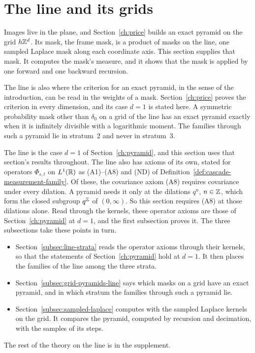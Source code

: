 \section{The line and its grids}
\label{sec:line-theory}

Images live in the plane, and Section~\ref{ch:price} builds an exact pyramid on the grid
$h\mathbb{Z}^d$. Its mask, the frame mask, is a product of masks on the line, one sampled Laplace mask
along each coordinate axis. This section supplies that mask. It computes the mask's \Levy{} measure,
and it shows that the mask is applied by one forward and one backward recursion.

The line is also where the criterion for an exact pyramid, in the sense of the introduction, can be
read in the weights of a mask. Section~\ref{ch:price} proves the criterion in every dimension, and
its case $d = 1$ is stated here. A symmetric probability mask other than $\delta_0$ on a grid of the line has an
exact pyramid exactly when it is infinitely divisible with a logarithmic moment. The families through
such a pyramid lie in stratum~2 and never in stratum~3.

The line is the case $d = 1$ of Section~\ref{ch:pyramid}, and this section uses that section's
results throughout. The line also has axioms of its own, stated for operators $\Phi_{s,t}$ on
$L^1(\mathbb{R})$ as (A1)--(A8) and (ND) of Definition~\ref{def:cascade-measurement-family}. Of these, the
covariance axiom (A8) requires covariance under every dilation. A pyramid needs it only at the
dilations $q^n$, $n \in \mathbb{Z}$, which form the closed subgroup $q^{\mathbb{Z}}$ of $(0,\infty)$. So this
section requires (A8) at those dilations alone. Read through the kernels, these operator axioms are
those of Section~\ref{ch:pyramid} at $d = 1$, and the first subsection proves it. The three
subsections take these points in turn.
\begin{itemize}
\item Section~\ref{subsec:line-strata} reads the operator axioms through their kernels, so that the
statements of Section~\ref{ch:pyramid} hold at $d = 1$. It then places the families of the line
among the three strata.
\item Section~\ref{subsec:grid-pyramids-line} says which masks on a grid have an exact pyramid, and
in which stratum the families through such a pyramid lie.
\item Section~\ref{subsec:sampled-laplace} computes with the sampled Laplace kernels on the grid. It
compares the \Matern{} pyramid, computed by recursion and decimation, with the samples of its
steps.
\end{itemize}
The rest of the theory on the line is in the supplement.

